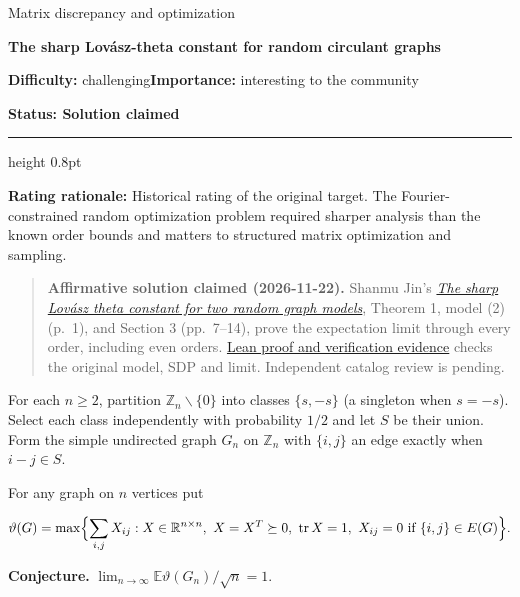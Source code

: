 \documentclass[11pt,a4paper]{article}
\begin{document}
{\sffamily\small\color{muted}Matrix discrepancy and optimization\par}
\vspace{3pt}
{\raggedright{}\sffamily\bfseries\fontsize{21}{24}\selectfont\color{ink}The
sharp Lovász-theta constant for random circulant graphs\par}
\vspace{7pt}
{\sffamily\small\textbf{Difficulty:} challenging\quad\textbf{Importance:} interesting
to the community\par}
{\sffamily\small\bfseries\color{accent}Status: Solution claimed\par}
\vspace{4pt}
{\color{accent}\hrule height 0.8pt}
\vspace{6pt}
\textbf{Rating rationale:} Historical rating of the original target. The
Fourier-constrained random optimization problem required sharper
analysis than the known order bounds and matters to structured matrix
optimization and sampling.

\begin{quote}
\textbf{Affirmative solution claimed (2026-11-22).} Shanmu Jin's
\href{https://github.com/ajt60gaibb/OpenProblemsInNLA/blob/main/references/jin-md02-2026-11-22/manuscript.pdf}{\emph{The
sharp Lovász theta constant for two random graph models}}, Theorem 1,
model (2) (p.~1), and Section 3 (pp.~7--14), prove the expectation limit
through every order, including even orders.
\href{https://github.com/ajt60gaibb/OpenProblemsInNLA/blob/main/matrix-discrepancy-and-optimization/MD-02\#lean-proof-and-verification-evidence}{Lean
proof and verification evidence} checks the original model, SDP and
limit. Independent catalog review is pending.
\end{quote}

For each \(n\ge2\), partition \(\mathbb Z_n\smallsetminus\{0\}\) into
classes \(\{s,-s\}\) (a singleton when \(s=-s\)). Select each class
independently with probability \(1/2\) and let \(S\) be their union.
Form the simple undirected graph \(G_n\) on \(\mathbb Z_n\) with
\(\{i,j\}\) an edge exactly when \(i-j\in S\).

For any graph on \(n\) vertices put

\[\vartheta(G)=\max\Bigl\{\sum_{i,j}X_{ij}:X\in\mathbb R^{n\times n},\ X=X^T\succeq0,\ \mathop{\mathrm{tr}}\nolimits X=1,\ X_{ij}=0\text{ if }\{i,j\}\in E(G)\Bigr\}.\]

\textbf{Conjecture.}
\(\displaystyle\lim_{n\to\infty}\mathbb E\vartheta(G_n)/\sqrt n=1\).
\end{document}

